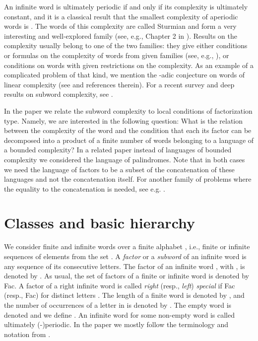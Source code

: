 \documentclass[runningheads,envcountsect,envcountsame]{llncs}
\begin{document}
An infinite word is ultimately periodic if and only if its complexity is ultimately constant, and it is a classical result that the smallest complexity of aperiodic words is  \cite{MoHe1}. The words of this complexity are called Sturmian and form a very interesting and well-explored family (see, e.g., Chapter 2 in \cite{Lo}). Results on the complexity usually belong to one of the two families: they give either conditions or formulas on the complexity of words from given families (see, e.g., \cite{pansiot}), or conditions on words with given restrictions on the complexity. As an example of a complicated problem of that kind, we mention the -adic conjecture on words of linear complexity (see \cite{leroy} and references therein). For a recent survey and deep results on subword complexity, see \cite{cas_livre}.

In the paper we relate the subword complexity to local conditions of factorization type.
Namely, we are interested in the following question: What is the relation between the complexity of the word and the condition that each its factor can be decomposed into a product of a finite number  of words belonging to a language of a bounded complexity? In a related paper \cite{fpz} instead of languages of bounded complexity we considered the language of palindromes. 
Note that in both cases we need the language of factors to be a subset of the concatenation of these languages and not the concatenation itself. For another family of problems where the equality to the concatenation is needed, see e.g. \cite{af,hsw}.

\section{Classes and basic hierarchy}

We consider finite and infinite words over a finite alphabet
, i.e., finite or infinite sequences of elements from the set . A \emph{factor} or a \emph{subword} of an infinite word
is any sequence of its consecutive letters. The factor
 of an infinite word ,
with , is denoted by . As usual, the set
of factors of a finite or infinite word  is denoted by
Fac. A factor  of a right infinite word  is called
\emph{right} (resp., \emph{left}) \emph{special} if 
Fac (resp.,  Fac) for distinct letters .  The length of a finite word  is denoted by ,
and the number of occurrences of a letter  in  is denoted by
. The empty word is denoted  and we define
. An infinite word  for some non-empty word  is called ultimately (-)periodic. In the paper we mostly follow the terminology and notation from \cite{Lo}.
\end{document}
